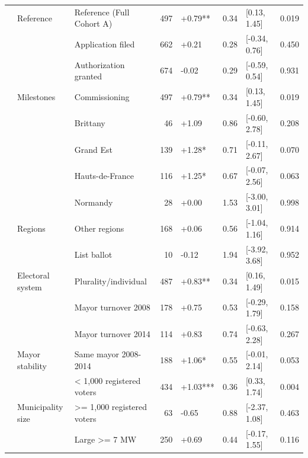 \begin{ThreePartTable}
\begin{longtable}[t]{lllrllll}
\cmidrule{1-8}\pagebreak[0]
 & Reference & Reference (Full Cohort A) & 497 & +0.79** & 0.34 & {}[0.13, 1.45] & 0.019\\
\cmidrule{2-8}\nopagebreak
 &  & Application filed & 662 & +0.21 & 0.28 & {}[-0.34, 0.76] & 0.450\\
\cmidrule{3-8}\nopagebreak
 &  & Authorization granted & 674 & -0.02 & 0.29 & {}[-0.59, 0.54] & 0.931\\
\cmidrule{3-8}\nopagebreak
 & \multirow[t]{-3}{*}{\raggedright\arraybackslash Milestones} & Commissioning & 497 & +0.79** & 0.34 & {}[0.13, 1.45] & 0.019\\
\cmidrule{2-8}\nopagebreak
 &  & Brittany & 46 & +1.09 & 0.86 & {}[-0.60, 2.78] & 0.208\\
\cmidrule{3-8}\nopagebreak
 &  & Grand Est & 139 & +1.28* & 0.71 & {}[-0.11, 2.67] & 0.070\\
\cmidrule{3-8}\nopagebreak
 &  & Hauts-de-France & 116 & +1.25* & 0.67 & {}[-0.07, 2.56] & 0.063\\
\cmidrule{3-8}\nopagebreak
 &  & Normandy & 28 & +0.00 & 1.53 & {}[-3.00, 3.01] & 0.998\\
\cmidrule{3-8}\nopagebreak
 & \multirow[t]{-5}{*}{\raggedright\arraybackslash Regions} & Other regions & 168 & +0.06 & 0.56 & {}[-1.04, 1.16] & 0.914\\
\cmidrule{2-8}\nopagebreak
 &  & List ballot & 10 & -0.12 & 1.94 & {}[-3.92, 3.68] & 0.952\\
\cmidrule{3-8}\nopagebreak
 & \multirow[t]{-2}{*}{\raggedright\arraybackslash Electoral system} & Plurality/individual & 487 & +0.83** & 0.34 & {}[0.16, 1.49] & 0.015\\
\cmidrule{2-8}\nopagebreak
 &  & Mayor turnover 2008 & 178 & +0.75 & 0.53 & {}[-0.29, 1.79] & 0.158\\
\cmidrule{3-8}\nopagebreak
 &  & Mayor turnover 2014 & 114 & +0.83 & 0.74 & {}[-0.63, 2.28] & 0.267\\
\cmidrule{3-8}\nopagebreak
 & \multirow[t]{-3}{*}{\raggedright\arraybackslash Mayor stability} & Same mayor 2008-2014 & 188 & +1.06* & 0.55 & {}[-0.01, 2.14] & 0.053\\
\cmidrule{2-8}\nopagebreak
 &  & < 1,000 registered voters & 434 & +1.03*** & 0.36 & {}[0.33, 1.74] & 0.004\\
\cmidrule{3-8}\nopagebreak
 & \multirow[t]{-2}{*}{\raggedright\arraybackslash Municipality size} & >= 1,000 registered voters & 63 & -0.65 & 0.88 & {}[-2.37, 1.08] & 0.463\\
\cmidrule{2-8}\nopagebreak
 &  & Large >= 7 MW & 250 & +0.69 & 0.44 & {}[-0.17, 1.55] & 0.116\\

\end{longtable}
\end{ThreePartTable}
